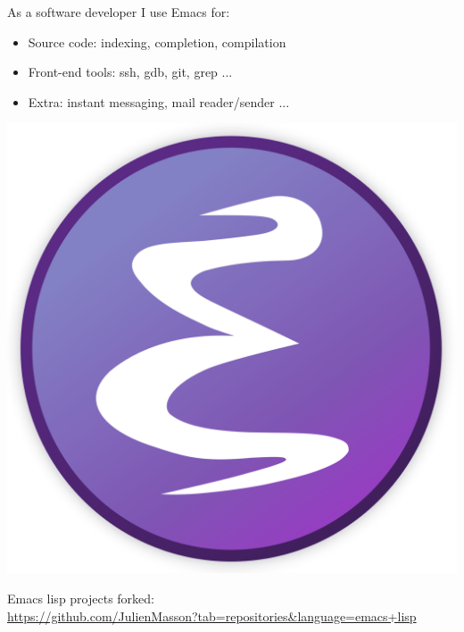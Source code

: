 \documentclass[letterpaper]{jm-cv} %
\begin{document}
\begin{minipage}{.7\textwidth}
  As a software developer I use Emacs for:
  \begin{itemize}
  \item[\color{mainblue}\faArrowRight] Source code: indexing, completion, compilation
  \item[\color{mainblue}\faArrowRight] Front-end tools: ssh, gdb, git, grep ...
  \item[\color{mainblue}\faArrowRight] Extra: instant messaging, mail reader/sender ...
  \end{itemize}
\end{minipage}%
\begin{minipage}{.3\textwidth}
  \center
  \includegraphics[scale=0.02]{logo-emacs.png}
\end{minipage}
\vspace{0.2cm}

Emacs lisp projects forked:\\
\url{https://github.com/JulienMasson?tab=repositories\&language=emacs+lisp}


\end{document}
